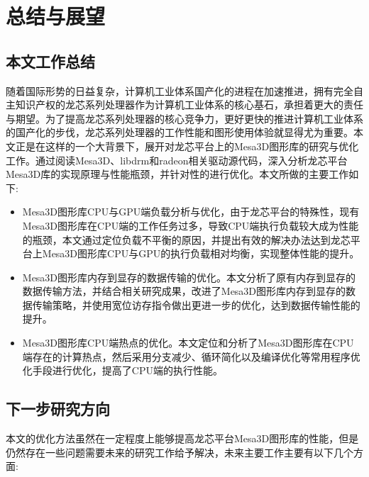 
\chapter{总结与展望}

\section{本文工作总结}

随着国际形势的日益复杂，计算机工业体系国产化的进程在加速推进，拥有完全自主知识产权的龙芯系列处理器作为计算机工业体系的核心基石，承担着更大的责任与期望。为了提高龙芯系列处理器的核心竞争力，更好更快的推进计算机工业体系的国产化的步伐，龙芯系列处理器的工作性能和图形使用体验就显得尤为重要。本文正是在这样的一个大背景下，展开对龙芯平台上的Mesa3D图形库的研究与优化工作。通过阅读Mesa3D、libdrm和radeon相关驱动源代码，深入分析龙芯平台Mesa3D库的实现原理与性能瓶颈，并针对性的进行优化。本文所做的主要工作如下:

\begin{itemize}
\item{} Mesa3D图形库CPU与GPU端负载分析与优化，由于龙芯平台的特殊性，现有Mesa3D图形库在CPU端的工作任务过多，导致CPU端执行负载较大成为性能的瓶颈，本文通过定位负载不平衡的原因，并提出有效的解决办法达到龙芯平台上Mesa3D图形库CPU与GPU的执行负载相对均衡，实现整体性能的提升。
\item{}	Mesa3D图形库内存到显存的数据传输的优化。本文分析了原有内存到显存的数据传输方法，并结合相关研究成果，改进了Mesa3D图形库内存到显存的数据传输策略，并使用宽位访存指令做出更进一步的优化，达到数据传输性能的提升。
\item{} Mesa3D图形库CPU端热点的优化。本文定位和分析了Mesa3D图形库在CPU端存在的计算热点，然后采用分支减少、循环简化以及编译优化等常用程序优化手段进行优化，提高了CPU端的执行性能。
\end{itemize}

\section{下一步研究方向}

本文的优化方法虽然在一定程度上能够提高龙芯平台Mesa3D图形库的性能，但是仍然存在一些问题需要未来的研究工作给予解决，未来主要工作主要有以下几个方面:

